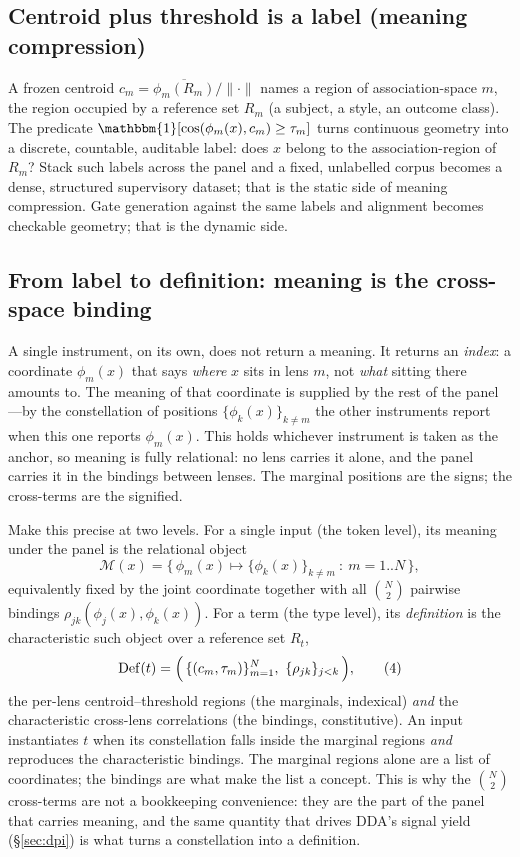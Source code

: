 \documentclass[10pt,twocolumn]{article}
\newcommand{\ind}{\mathbbm{1}}
\begin{document}
\subsection{Centroid plus threshold is a label (meaning compression)}
A frozen centroid $c_m = \overline{\phi_m(R_m)}/\lVert\cdot\rVert$ names a region
of association-space $m$, the region occupied by a reference set $R_m$ (a subject,
a style, an outcome class). The predicate $\ind[\cos(\phi_m(x),c_m)\ge\tau_m]$
turns continuous geometry into a discrete, countable, auditable label: does $x$
belong to the association-region of $R_m$? Stack such labels across the panel and
a fixed, unlabelled corpus becomes a dense, structured supervisory dataset; that
is the static side of meaning compression. Gate generation against the same
labels and alignment becomes checkable geometry; that is the dynamic side.

\subsection{From label to definition: meaning is the cross-space binding}
\label{sec:definition}
A single instrument, on its own, does not return a meaning. It returns an
\emph{index}: a coordinate $\phi_m(x)$ that says \emph{where} $x$ sits in lens
$m$, not \emph{what} sitting there amounts to. The meaning of that coordinate is
supplied by the rest of the panel---by the constellation of positions
$\{\phi_k(x)\}_{k\neq m}$ the other instruments report when this one reports
$\phi_m(x)$. This holds whichever instrument is taken as the anchor, so meaning
is fully relational: no lens carries it alone, and the panel carries it in the
bindings between lenses. The marginal positions are the signs; the cross-terms
are the signified.

Make this precise at two levels. For a single input (the token level), its
meaning under the panel is the relational object
\begin{equation}
\mathcal{M}(x) = \bigl\{\,\phi_m(x)\mapsto\{\phi_k(x)\}_{k\neq m}\ :\ m=1..N\,\bigr\},
\tag{3}
\end{equation}
equivalently fixed by the joint coordinate together with all $\binom{N}{2}$
pairwise bindings $\rho_{jk}(\phi_j(x),\phi_k(x))$. For a term (the type level),
its \emph{definition} is the characteristic such object over a reference set
$R_t$,
\begin{equation}
\mathrm{Def}(t) = \Bigl(\,\{(c_m,\tau_m)\}_{m=1}^{N},\ \{\rho_{jk}\}_{j<k}\,\Bigr),
\tag{4}
\end{equation}
the per-lens centroid--threshold regions (the marginals, indexical) \emph{and}
the characteristic cross-lens correlations (the bindings, constitutive). An input
instantiates $t$ when its constellation falls inside the marginal regions
\emph{and} reproduces the characteristic bindings. The marginal regions alone are
a list of coordinates; the bindings are what make the list a concept. This is why
the $\binom{N}{2}$ cross-terms are not a bookkeeping convenience: they are the
part of the panel that carries meaning, and the same quantity that drives DDA's
signal yield (\S\ref{sec:dpi}) is what turns a constellation into a definition.
\end{document}
